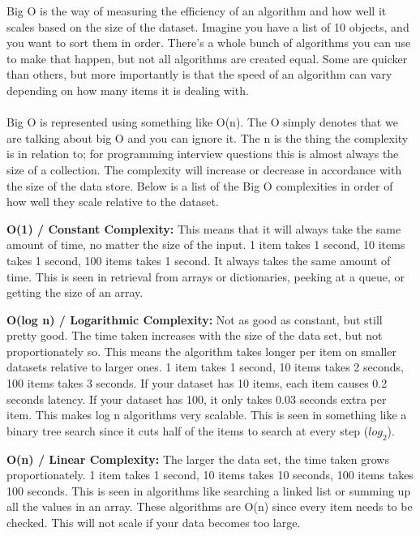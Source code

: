 \documentclass[9pt]{extarticle} %
\begin{document}
\begin{minipage}[t]{.64\linewidth} %
\vspace{-0.4cm}
\hypertarget{firstnews}{}

Big O is the way of measuring the efficiency of an algorithm and how well it 
scales based on the size of the dataset. Imagine you have a list of 10 objects,
and you want to sort them in order. There’s a whole bunch of algorithms you can 
use to make that happen, but not all algorithms are created equal. Some are 
quicker than others, but more importantly is that the speed of an algorithm can
vary depending on how many items it is dealing with. \\
\\
Big O is represented using something like O(n). The O simply denotes that we are 
talking about big O and you can ignore it. The n is the thing the complexity is
in relation to; for programming interview questions this is almost always the 
size of a collection. The complexity will increase or decrease in accordance 
with the size of the data store. Below is a list of the Big O complexities 
in order of how well they scale relative to the dataset.

\textbf{O(1) / Constant Complexity:} 
This means that it will always take the same amount of time, no matter the size
of the input. 1 item takes 1 second, 10 items takes 1 second, 100 items 
takes 1 second. It always takes the same amount of time. This is seen in 
retrieval from arrays or dictionaries, peeking at a queue, or getting the size 
of an array.

\textbf{O(log n) / Logarithmic Complexity:}
Not as good as constant, but still pretty good. The time taken increases with 
the size of the data set, but not proportionately so. This means the algorithm
takes longer per item on smaller datasets relative to larger ones. 1 item 
takes 1 second, 10 items takes 2 seconds, 100 items takes 3 seconds. If your
dataset has 10 items, each item causes 0.2 seconds latency. If your dataset has
100, it only takes 0.03 seconds extra per item. This makes log n algorithms 
very scalable. This is seen in something like a binary tree search since it cuts
half of the items to search at every step ($log_2$).

\textbf{O(n) / Linear Complexity:}
The larger the data set, the time taken grows proportionately. 1 item takes 1
second, 10 items takes 10 seconds, 100 items takes 100 seconds. This is seen
in algorithms like searching a linked list or summing up all the values in an 
array. These algorithms are O(n) since every item needs to be checked. 
This will not scale if your data becomes too large.


\end{minipage}
\end{document}
